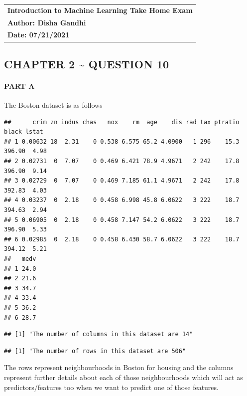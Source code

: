 \documentclass[
]{article}
\author{}
\date{\vspace{-2.5em}}
\begin{document}
\begin{longtable}[]{@{}l@{}}
\toprule
\endhead
\textbf{Introduction to Machine Learning Take Home Exam} \\
\textbf{Author: Disha Gandhi} \\
\textbf{Date: 07/21/2021} \\
\bottomrule
\end{longtable}

\hypertarget{chapter-2-question-10}{%
\subsection{CHAPTER 2 \textasciitilde{} QUESTION
10}\label{chapter-2-question-10}}

\hypertarget{part-a}{%
\paragraph{PART A}\label{part-a}}

The Boston dataset is as follows

\begin{verbatim}
##      crim zn indus chas   nox    rm  age    dis rad tax ptratio  black lstat
## 1 0.00632 18  2.31    0 0.538 6.575 65.2 4.0900   1 296    15.3 396.90  4.98
## 2 0.02731  0  7.07    0 0.469 6.421 78.9 4.9671   2 242    17.8 396.90  9.14
## 3 0.02729  0  7.07    0 0.469 7.185 61.1 4.9671   2 242    17.8 392.83  4.03
## 4 0.03237  0  2.18    0 0.458 6.998 45.8 6.0622   3 222    18.7 394.63  2.94
## 5 0.06905  0  2.18    0 0.458 7.147 54.2 6.0622   3 222    18.7 396.90  5.33
## 6 0.02985  0  2.18    0 0.458 6.430 58.7 6.0622   3 222    18.7 394.12  5.21
##   medv
## 1 24.0
## 2 21.6
## 3 34.7
## 4 33.4
## 5 36.2
## 6 28.7
\end{verbatim}

\begin{verbatim}
## [1] "The number of columns in this dataset are 14"
\end{verbatim}

\begin{verbatim}
## [1] "The number of rows in this dataset are 506"
\end{verbatim}

The rows represent neighbourhoods in Boston for housing and the columns
represent further details about each of those neighbourhoods which will
act as predictors/features too when we want to predict one of those
features.

\pagebreak
\end{document}
